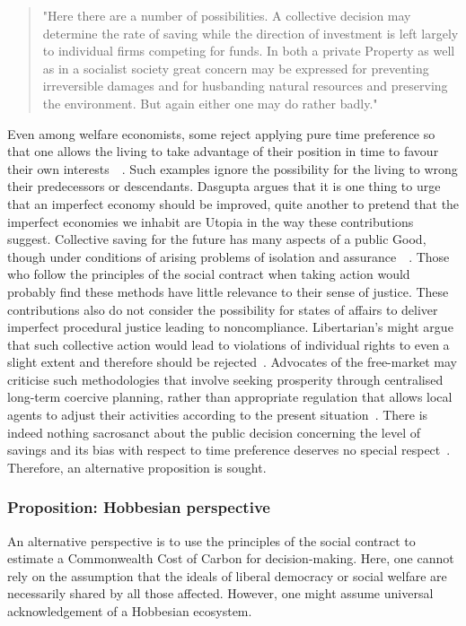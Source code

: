 \documentclass[11pt, oneside]{article}   	%
\begin{document}
\begin{quote}
"Here there are a number of possibilities. A collective decision may determine the rate of saving while the direction of investment is left largely to individual firms competing for funds. In both a private Property as well as in a socialist society great concern may be expressed for preventing irreversible damages and for husbanding natural resources and preserving the environment. But again either one may do rather badly."~\cite{jr1}
\end{quote}

Even among welfare economists, some reject applying pure time preference so that one allows the living to take advantage of their position in time to favour their own interests~\cite{hs1}~\cite{fr1}. Such examples ignore the possibility for the living to wrong their predecessors or descendants. Dasgupta argues that it is one thing to urge that an imperfect economy should be improved, quite another to pretend that the imperfect economies we inhabit are Utopia in the way these contributions suggest. Collective saving for the future has many aspects of a public Good, though under conditions of arising problems of isolation and assurance~\cite{as1}~\cite{ms1}.  Those who follow the principles of the social contract when taking action would probably find these methods have little relevance to their sense of justice. These contributions also do not consider the possibility for states of affairs to deliver imperfect procedural justice leading to noncompliance. Libertarian's might argue that such collective action would lead to violations of individual rights to even a slight extent and therefore should be rejected~\cite{rn1}. Advocates of the free-market may criticise such methodologies that involve seeking prosperity through centralised long-term coercive planning, rather than appropriate regulation that allows local agents to adjust their activities according to the present situation~\cite{fh1}. There is indeed nothing sacrosanct about the public decision concerning the level of savings and its bias with respect to time preference deserves no special respect~\cite{jr1}. Therefore, an alternative proposition is sought.

\subsubsection{Proposition: Hobbesian perspective}

An alternative perspective is to use the principles of the social contract to estimate a Commonwealth Cost of Carbon for decision-making.
Here, one cannot rely on the assumption that the ideals of liberal democracy or social welfare are necessarily shared by all those affected.
However, one might assume universal acknowledgement of a Hobbesian ecosystem.
\end{document}
